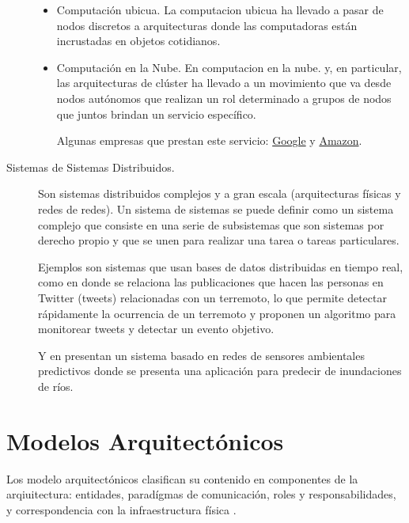 \begin{description}
\begin{itemize}
		\item Computación ubicua. La \gls{computacion ubicua} ha llevado a pasar de nodos discretos a arquitecturas donde las computadoras están incrustadas en objetos cotidianos. 
		
		\item Computación en la Nube. En \gls{computacion en la nube}. y, en particular, las arquitecturas de clúster ha llevado a un movimiento que va  desde nodos autónomos que realizan un rol determinado a grupos de nodos que juntos brindan un servicio específico. 
		
		Algunas empresas que prestan este servicio: \href{https://cloud.google.com/}{Google}  y 				\href{https://aws.amazon.com/es/}{Amazon}.
	
	\end{itemize}

	\item[Sistemas de Sistemas Distribuidos.] Son  sistemas distribuidos complejos y a gran escala (arquitecturas físicas y redes de redes). Un sistema de sistemas se puede definir como un sistema complejo que consiste en una serie de subsistemas que son sistemas por derecho propio y que se unen para realizar una tarea o tareas particulares. 

	Ejemplos son sistemas que usan bases de datos distribuidas en tiempo real, como en \cite{Sakaki2010} donde se relaciona  las publicaciones que hacen  las personas en Twitter (tweets) relacionadas con un terremoto, lo que permite detectar rápidamente la ocurrencia de un terremoto y proponen un algoritmo para monitorear tweets y detectar un evento objetivo.  
	
	Y en \cite{Basha2008} presentan un sistema basado en  redes de sensores ambientales predictivos donde se presenta una aplicación para predecir de inundaciones de ríos.	
\end{description}

\section{Modelos Arquitect\'onicos }
\label{sec:mod-arquitec}

Los modelo arquitectónicos clasifican su contenido en componentes de la arqiuitectura: entidades, paradígmas de comunicación, roles y responsabilidades, y correspondencia con la infraestructura física \cite{Coulouris2011}.

